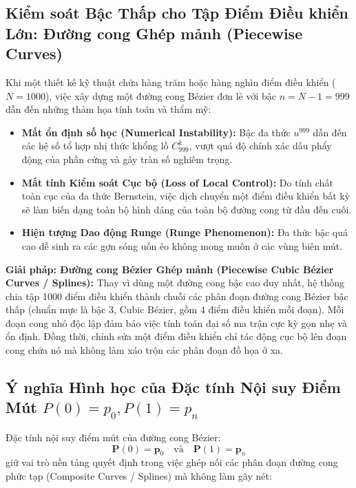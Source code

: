 \subsection{Kiểm soát Bậc Thấp cho Tập Điểm Điều khiển Lớn: Đường cong Ghép mảnh (Piecewise Curves)}

Khi một thiết kế kỹ thuật chứa hàng trăm hoặc hàng nghìn điểm điều khiển ($N = 1000$), việc xây dựng một đường cong Bézier đơn lẻ với bậc $n = N - 1 = 999$ dẫn đến những thảm họa tính toán và thẩm mỹ:
\begin{itemize}
    \item \textbf{Mất ổn định số học (Numerical Instability):} Bậc đa thức $u^{999}$ dẫn đến các hệ số tổ hợp nhị thức khổng lồ $C_{999}^k$, vượt quá độ chính xác dấu phẩy động của phần cứng và gây tràn số nghiêm trọng.
    \item \textbf{Mất tính Kiểm soát Cục bộ (Loss of Local Control):} Do tính chất toàn cục của đa thức Bernstein, việc dịch chuyển một điểm điều khiển bất kỳ sẽ làm biến dạng toàn bộ hình dáng của toàn bộ đường cong từ đầu đến cuối.
    \item \textbf{Hiện tượng Dao động Runge (Runge Phenomenon):} Đa thức bậc quá cao dễ sinh ra các gợn sóng uốn éo không mong muốn ở các vùng biên mút.
\end{itemize}

\textbf{Giải pháp: Đường cong Bézier Ghép mảnh (Piecewise Cubic Bézier Curves / Splines):}
Thay vì dùng một đường cong bậc cao duy nhất, hệ thống chia tập 1000 điểm điều khiển thành chuỗi các phân đoạn đường cong Bézier bậc thấp (chuẩn mực là bậc 3, Cubic Bézier, gồm 4 điểm điều khiển mỗi đoạn). Mỗi đoạn cong nhỏ độc lập đảm bảo việc tính toán đại số ma trận cực kỳ gọn nhẹ và ổn định. Đồng thời, chỉnh sửa một điểm điều khiển chỉ tác động cục bộ lên đoạn cong chứa nó mà không làm xáo trộn các phân đoạn đồ họa ở xa.

\subsection{Ý nghĩa Hình học của Đặc tính Nội suy Điểm Mút \texorpdfstring{$P(0) = p_0, P(1) = p_n$}{P(0) = p0, P(1) = pn}}
\label{subsec:w5_slide5}

Đặc tính nội suy điểm mút của đường cong Bézier:
\begin{equation}
\mathbf{P}(0) = \mathbf{p}_0 \quad \text{và} \quad \mathbf{P}(1) = \mathbf{p}_n
\end{equation}
giữ vai trò nền tảng quyết định trong việc ghép nối các phân đoạn đường cong phức tạp (Composite Curves / Splines) mà không làm gãy nét:


